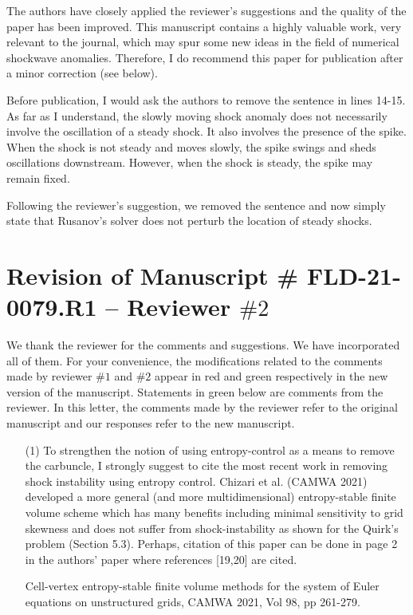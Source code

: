 \documentclass[english,11pt]{article}
\begin{document}
{\color{red}
  The authors have closely applied the reviewer's suggestions 
  and the quality of the paper has been improved. This manuscript contains 
  a highly valuable work, very relevant to the journal, which may spur 
  some new ideas in the field of numerical shockwave anomalies. 
  Therefore, I do recommend this paper for publication after a minor correction (see below).

  Before publication, I would ask the authors to remove the sentence in lines 14-15. 
  As far as I understand, the slowly moving shock anomaly does not necessarily 
  involve the oscillation of a steady shock. It also involves the presence of the spike. 
  When the shock is not steady and moves slowly, the spike swings and sheds oscillations 
  downstream. However, when the shock is steady, the spike may remain fixed.
}

\noindent
Following the reviewer's suggestion, we removed the sentence and now simply state that
Rusanov's solver does not perturb the location of steady shocks. 


\newpage
\section*{Revision of Manuscript \# FLD-21-0079.R1 -- Reviewer $\#2$}
We thank the reviewer for the comments and suggestions.
We have incorporated all of them.  For your convenience,
the modifications related to the comments made by reviewer $\#1$ and $\#2$
appear in red and green respectively in the new version of the manuscript.
Statements in green below are comments from the reviewer.
In this letter, the comments made by the reviewer refer to the original
manuscript and our responses refer to the new manuscript.

\bigskip
{\color{OliveGreen}
  \begin{itemize}
  \item[(1)]
    To strengthen the notion of using entropy-control as a means to remove the carbuncle, 
    I strongly suggest to cite the most recent work in removing shock instability using 
    entropy control. Chizari et al.
    (CAMWA 2021) developed a more general (and more multidimensional) entropy-stable finite volume
    scheme which has many benefits including minimal sensitivity to grid skewness and does not 
    suffer from shock-instability as shown for the Quirk's problem (Section 5.3). 
    Perhaps, citation of this paper can be done in page 2 in the authors' paper where 
    references [19,20] are cited.

    Cell-vertex entropy-stable finite volume methods for the system of Euler equations 
    on unstructured grids, CAMWA 2021, Vol 98, pp 261-279.
  \end{itemize}
}
\end{document}
